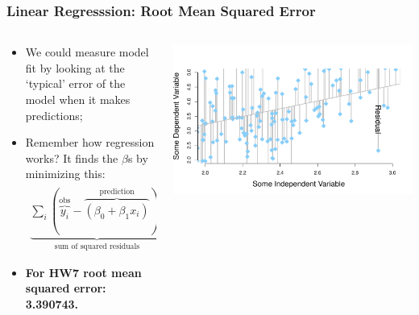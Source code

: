 \documentclass[aspectratio=169]{beamer}
\theoremstyle{principle}
\begin{document}
\begin{frame}
\frametitle{Linear Regresssion: Root Mean Squared Error}

\begin{columns}
\begin{column}{0.5\textwidth}

\begin{itemize}
\item We could measure model fit by looking at the `typical' error of the model when it makes predictions;
\bigskip

\item Remember how regression works?  It finds the $\beta$s by minimizing this:
\begin{align*}
\underbrace{\sum_i(\overbrace{y_i}^{\mbox{obs}} - \overbrace{(\beta_0 + \beta_1 x_i)}^{\mbox{prediction}})^2}_{\mbox{sum of squared residuals}}
\end{align*}

\item[] \color{white}\textbf{For HW7 root mean squared error: 3.390743.}
\end{itemize}

\end{column}
\begin{column}{0.5\textwidth}
\includegraphics[scale=0.35]{point_cloud_line_zoomed_residuals.pdf}
\end{column}
\end{columns}

\end{frame}
\end{document}
